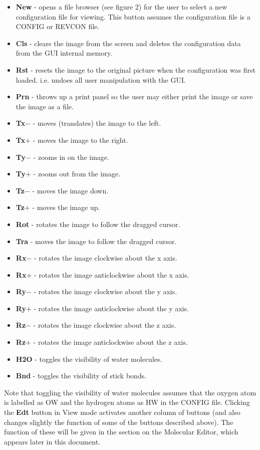 \begin{itemize}
\item {\bf New} - opens a file browser (see figure 2)
for the user to select a new configuration file for viewing. This
button assumes the configuration file is a \DD{} CONFIG or REVCON
file.
\item {\bf Cls} - clears the image from the screen and deletes the
configuration data from the GUI internal memory.
\item {\bf Rst} - resets the image to the original picture when the
configuration was first loaded. i.e. undoes all user manipulation with
the GUI.
\item {\bf Prn} - throws up a print panel so the user may either print
the image or save the image as a file.
\item {\bf Tx$-$} - moves (translates) the image to the left.
\item {\bf Tx$+$} - moves the image to the right.
\item {\bf Ty$-$} - zooms in on the image.
\item {\bf Ty$+$} - zooms out from the image.
\item {\bf Tz$-$} - moves the image down.
\item {\bf Tz$+$} - moves the image up.
\item {\bf Rot} - rotates the image to follow the dragged cursor.
\item {\bf Tra} - moves the image to follow the dragged cursor.
\item {\bf Rx$-$} - rotates the image clockwise about the x axis.
\item {\bf Rx$+$} - rotates the image anticlockwise about the x axis.
\item {\bf Ry$-$} - rotates the image clockwise about the y axis.
\item {\bf Ry$+$} - rotates the image anticlockwise about the y axis.
\item {\bf Rz$-$} - rotates the image clockwise about the z axis.
\item {\bf Rz$+$} - rotates the image anticlockwise about the z axis.
\item {\bf H2O} - toggles the visibility of water molecules.
\item {\bf Bnd} - toggles the visibility of stick bonds.
\end{itemize}

Note that toggling the visibility of water molecules assumes that the oxygen
atom is labelled as OW and the hydrogen atoms as HW in the CONFIG file.
Clicking the {\bf Edt} button in View mode activates another column of buttons
(and also changes slightly the function of some of the buttons described
above). The function of these will be given in the section on the Molecular
Editor, which appears later in this document.

